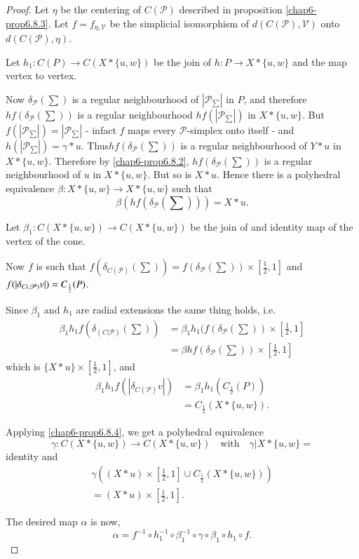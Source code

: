 \begin{proof}
Let $\eta$ be the centering of $C(\mathscr{P})$ described in
proposition \ref{chap6-prop6.8.3}. Let $f=f_{\eta,\mathscr{V}}$ be the
simplicial isomorphism of $d(C(\mathscr{P}),\mathscr{V})$ onto\break
$d(C(\mathscr{P}),\eta)$. 

Let $h_{1}:C(P)\to C(X\ast\{u,w\})$ be the join of $h:P\to X\ast \{u,w\}$ and the map vertex to vertex.

Now $\delta_{\mathscr{P}}(\sum)$ is a regular neighbourhood of $|\mathscr{P}_{\sum}|$ in $P$, and therefore $hf(\delta_{\mathscr{P}}(\sum))$ is a regular neighbourhood $hf(|\mathscr{P}_{\sum}|)$ in $X\ast \{u,w\}$. But $f(|\mathscr{P}_{\sum}|)=|\mathscr{P}_{\sum}|$ - infact $f$ maps every $\mathscr{P}$-simplex onto itself - and $h(|\mathscr{P}_{\sum}|)= \gamma \ast u$. Thus\pageoriginale $hf(\delta_{\mathscr{P}}(\sum))$ is a regular neighbourhood of $Y\ast u$ in $X\ast \{u,w\}$. Therefore by \ref{chap6-prop6.8.2}, $hf(\delta_{\mathscr{P}}(\sum))$ is a regular neighbourhood of $u$ in $X\ast\{u,w\}$. But so is $X\ast u$. Hence there is a polyhedral equivalence $\beta:X\ast \{u,w\}\to X\ast \{u,w\}$ such that
$$
\beta(hf(\delta_{\mathscr{P}}(\sum)))=X\ast u.
$$

Let $\beta_{1}:C(X\ast \{u,w\})\to C(X\ast \{u,w\})$ be the join of and identity map of the vertex of the cone.

Now $f$ is such that
$f(\delta_{C(\mathscr{P})}(\sum))=f(\delta_{\mathscr{P}}(\sum))\times[\frac{1}{2},1]$
and $f(|\delta_{C(\mathscr{P})}\break v|)=C_{\frac{1}{2}}(P)$. 

Since $\beta_{1}$ and $h_{1}$ are radial extensions the same thing holds, i.e.
\begin{align*}
\beta_{1}h_{1}f(\delta_{(C|\mathscr{P})}(\sum)) &= \beta_{1}h_{1}(f(\delta_{\mathscr{P}}(\sum))\times [\frac{1}{2},1]\\
&= \beta hf(\delta_{\mathscr{P}}(\sum))\times[\frac{1}{2},1]
\end{align*}
which is $\{X\ast u\}\times [\frac{1}{2},1]$, and
\begin{align*}
\beta_{1}h_{1}f(|\delta_{C(\mathscr{P})}v|) &= \beta_{1}h_{1}(C_{\frac{1}{2}}(P))\\
&= C_{\frac{1}{2}}(X\ast \{u,w\}).
\end{align*}

Applying \ref{chap6-prop6.8.4}, we get a polyhedral equivalence
$$
\gamma:C(X\ast\{u,w\})\to C(X\ast \{u,w\})\quad\text{with}\quad \gamma|X\ast\{u,w\}=
$$
identity and
\begin{gather*}
\gamma \left((X\ast u)\times[\frac{1}{2},1]\cup C_{\frac{1}{2}}(X\ast\{u,w\})\right)\\
=(X\ast u)\times[\frac{1}{2},1].
\end{gather*}

The desired map $\alpha$ is now,
$$
\alpha=f^{-1} \circ h^{-1}_{1} \circ \beta_{1}^{-1} \circ \gamma \circ \beta_{1} \circ h_{1} \circ f.
$$
\end{proof}

